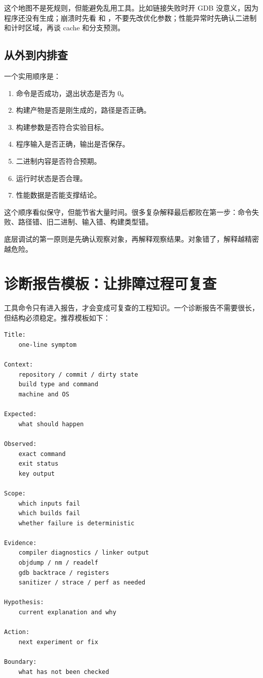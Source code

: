这个地图不是死规则，但能避免乱用工具。比如链接失败时开 GDB 没意义，因为程序还没有生成；崩溃时先看  和 ，不要先改优化参数；性能异常时先确认二进制和计时区域，再谈 cache 和分支预测。

\subsection{从外到内排查}

一个实用顺序是：

\begin{enumerate}
  \item 命令是否成功，退出状态是否为 0。
  \item 构建产物是否是刚生成的，路径是否正确。
  \item 构建参数是否符合实验目标。
  \item 程序输入是否正确，输出是否保存。
  \item 二进制内容是否符合预期。
  \item 运行时状态是否合理。
  \item 性能数据是否能支撑结论。
\end{enumerate}

这个顺序看似保守，但能节省大量时间。很多复杂解释最后都败在第一步：命令失败、路径错、旧二进制、输入错、构建类型错。

\begin{keyidea}
底层调试的第一原则是先确认观察对象，再解释观察结果。对象错了，解释越精密越危险。
\end{keyidea}

\section{诊断报告模板：让排障过程可复查}

工具命令只有进入报告，才会变成可复查的工程知识。一个诊断报告不需要很长，但结构必须稳定。推荐模板如下：

\begin{lstlisting}
Title:
    one-line symptom

Context:
    repository / commit / dirty state
    build type and command
    machine and OS

Expected:
    what should happen

Observed:
    exact command
    exit status
    key output

Scope:
    which inputs fail
    which builds fail
    whether failure is deterministic

Evidence:
    compiler diagnostics / linker output
    objdump / nm / readelf
    gdb backtrace / registers
    sanitizer / strace / perf as needed

Hypothesis:
    current explanation and why

Action:
    next experiment or fix

Boundary:
    what has not been checked
\end{lstlisting}

